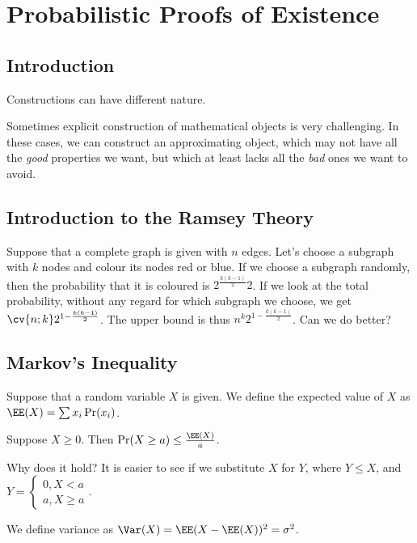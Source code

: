 \documentclass[11pt]{scrartcl}
\begin{document}
  \section{Probabilistic Proofs of Existence}

  \subsection{Introduction}

  Constructions can have different nature.

  Sometimes explicit construction of mathematical objects is very
  challenging. In these cases, we can construct an approximating
  object, which may not have all the \textit{good} properties we want, but
  which at least lacks all the \textit{bad} ones we want to avoid.

  \subsection{Introduction to the Ramsey Theory}

  Suppose that a complete graph is given with $n$ edges. Let's choose
  a subgraph with $k$ nodes and colour its nodes red or blue. If we
  choose a subgraph randomly, then the probability that it is coloured
  is $2^{\frac{k(k-1)}{2}}2$. If we look at the total probability,
  without any regard for which subgraph we choose, we get
  $\cv{n;k}2^{1- \frac{k(k-1)}{2}}$. The upper bound is thus
  $n^{k}2^{1- \frac{k(k-1)}{2}}$. Can we do better?

  \subsection{Markov's Inequality}

  Suppose that a random variable $X$ is given. We define the expected
  value of $X$ as $\EE(X) = \sum x_{i}\Pr(x_{i})$.

  \begin{theorem}
    Suppose $X \geq 0$. Then $\Pr(X \geq a) \leq \frac{\EE(X)}{a}$.
  \end{theorem}

    Why does it hold? It is easier to see if we substitute $X$ for $Y$,
  where $Y \leq X$, and $Y = \begin{cases}
      0, X < a\\
      a, X \geq a
    \end{cases}$.

    We define variance as $\Var(X) = \EE(X-\EE(X))^{2} = \sigma^{2}$.
      
\end{document}

